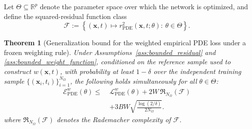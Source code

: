 \documentclass{article}
\theoremstyle{plain}
\newtheorem{theorem}{Theorem}[section]
\theoremstyle{definition}
\theoremstyle{remark}
\begin{document}
Let $\Theta\subseteq\mathbb{R}^p$ denote the parameter space over which
the network is optimized, and define the squared-residual function class
\begin{equation}
	\mathcal{F}
	:=
	\left\{
	(\boldsymbol{x},t)\mapsto
	r_{\mathrm{PDE}}^2(\boldsymbol{x},t;\theta)
	:\ \theta\in\Theta
	\right\}.
	\label{eq:app_function_class}
\end{equation}

\begin{theorem}[Generalization bound for the weighted empirical PDE loss under a frozen weighting rule]
	\label{thm:weighted_generalization}
	Under Assumptions~\ref{ass:bounded_residual} and
	\ref{ass:bounded_weight_function}, conditioned on the reference sample
	used to construct $w(\boldsymbol{x},t)$, with probability at least
	$1-\delta$ over the independent training sample
	$\{(\boldsymbol{x}_i,t_i)\}_{i=1}^{N_{\Omega}}$, the following holds
	simultaneously for all $\theta\in\Theta$:
	\begin{equation}
		\begin{aligned}
			\mathcal{E}_{\mathrm{PDE}}^{w}(\theta)
			\leqslant\;&
			\mathcal{L}_{\mathrm{PDE}}^{w}(\theta)
			+
			2W\,\mathfrak{R}_{N_{\Omega}}(\mathcal{F}) \\
			&+
			3BW\sqrt{\frac{\log(2/\delta)}{2N_{\Omega}}}.
		\end{aligned}
		\label{eq:app_weighted_generalization}
	\end{equation}
	where $\mathfrak{R}_{N_{\Omega}}(\mathcal{F})$ denotes the Rademacher
	complexity of $\mathcal{F}$.
\end{theorem}
\end{document}
